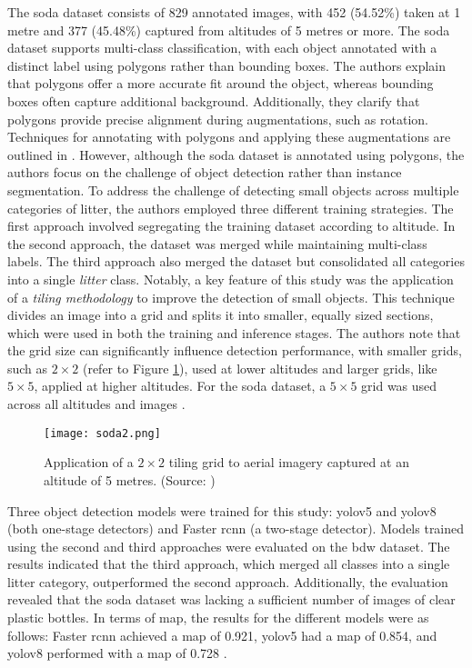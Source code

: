 The \gls{soda} dataset consists of 829 annotated images, with 452 (54.52\%) taken at 1 metre and 377 (45.48\%) captured from altitudes of 5 metres or more. 
The \gls{soda} dataset supports multi-class classification, with each object annotated with a distinct label using polygons rather than bounding boxes. The authors explain that polygons offer a more accurate fit around the object, whereas bounding boxes often capture additional background. Additionally, they clarify that polygons provide precise alignment during augmentations, such as rotation. Techniques for annotating with polygons and applying these augmentations are outlined in \cite{mask_to_annotation}. However, although the \gls{soda} dataset is annotated using polygons, the authors focus on the challenge of object detection rather than instance segmentation.
To address the challenge of detecting small objects across multiple categories of litter, the authors employed three different training strategies. The first approach involved segregating the training dataset according to altitude. In the second approach, the dataset was merged while maintaining multi-class labels. The third approach also merged the dataset but consolidated all categories into a single \textit{litter} class. 
Notably, a key feature of this study was the application of a \textit{tiling methodology} to improve the detection of small objects. This technique divides an image into a grid and splits it into smaller, equally sized sections, which were used in both the training and inference stages. The authors note that the grid size can significantly influence detection performance, with smaller grids, such as $2 \times 2$ (refer to Figure \ref{fig:soda2}), used at lower altitudes and larger grids, like $5 \times 5$, applied at higher altitudes. For the \gls{soda} dataset, a $5 \times 5$ grid was used across all altitudes and images \cite{detect_litter, soda_dataset, daniel_thesis}.

\begin{figure}[!htbp]
    \centering
    \texttt{[image: soda2.png]}
    \caption{Application of a $2 \times 2$ tiling grid to aerial imagery captured at an altitude of 5 metres. (Source: \cite{detect_litter})}
    \label{fig:soda2}
\end{figure}

Three object detection models were trained for this study: \gls{yolo}v5 and \gls{yolo}v8 (both one-stage detectors) and Faster \gls{rcnn} (a two-stage detector). Models trained using the second and third approaches were evaluated on the \gls{bdw} dataset. The results indicated that the third approach, which merged all classes into a single litter category, outperformed the second approach. Additionally, the evaluation revealed that the \gls{soda} dataset was lacking a sufficient number of images of clear plastic bottles. 
In terms of \gls{map}, the results for the different models were as follows: Faster \gls{rcnn} achieved a \gls{map} of 0.921, \gls{yolo}v5 had a \gls{map} of 0.854, and \gls{yolo}v8 performed with a \gls{map} of 0.728 \cite{soda_dataset, detect_litter}. 

